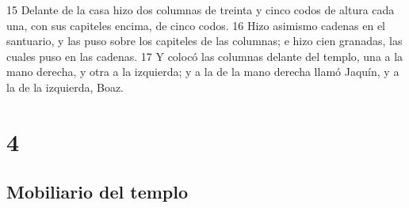 15 Delante de la casa hizo dos columnas de treinta y cinco codos   de altura cada una, con sus capiteles encima, de cinco codos.
16 Hizo asimismo cadenas en el santuario, y las puso sobre los capiteles de las columnas; e hizo cien granadas, las cuales puso en las cadenas.
17 Y colocó las columnas delante del templo, una a la mano derecha, y otra a la izquierda; y a la de la mano derecha llamó Jaquín, y a la de la izquierda, Boaz.

\chapter{4}

\section*{Mobiliario del templo }

